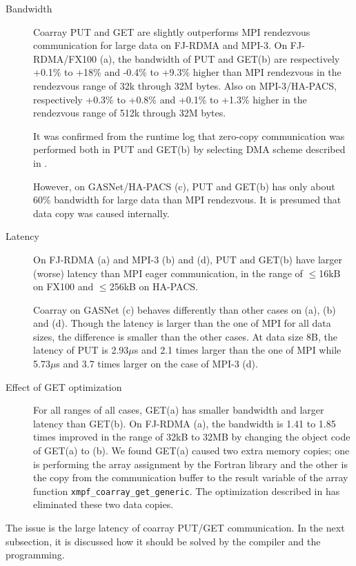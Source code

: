 \begin{description}

\item [Bandwidth]
Coarray PUT and GET are slightly outperforms MPI rendezvous communication for large data 
on FJ-RDMA and MPI-3.
On FJ-RDMA/FX100 (a), the bandwidth of PUT and GET(b) are respectively 
+0.1\% to +18\% and -0.4\% to +9.3\% higher than MPI rendezvous in the 
rendezvous range of 32k through 32M bytes.
Also on MPI-3/HA-PACS, respectively +0.3\% to +0.8\% and 
+0.1\% to +1.3\% higher in the rendezvous range of 512k through 32M bytes.

It was confirmed from the runtime log that zero-copy communication was performed
both in PUT and GET(b) by selecting DMA scheme described in .

However, on GASNet/HA-PACS (c), PUT and GET(b) has only about 60\% bandwidth for large data
than MPI rendezvous.
It is presumed that data copy was caused internally.

\item [Latency]
On FJ-RDMA (a) and MPI-3 (b) and (d), PUT and GET(b) have larger (worse) latency than 
MPI eager communication, in the range of $\leq$16kB on FX100 and $\leq$256kB on HA-PACS.

Coarray on GASNet (c) behaves differently than other cases on (a), (b) and (d).
Though the latency is larger than the one of MPI for all data sizes, the difference
is smaller than the other cases. At data size 8B, the latency of PUT is 2.93$\mu$s
and 2.1 times larger than the one of MPI 
while 5.73$\mu$s and 3.7 times larger on the case of MPI-3 (d).

\item [Effect of GET optimization]
For all ranges of all cases, GET(a) has smaller bandwidth and larger latency than GET(b).
On FJ-RDMA (a), the bandwidth is 1.41 to 1.85 times improved in the range of 32kB to 32MB
by changing the object code of GET(a) to (b).
We found GET(a) caused two extra memory copies; one is performing the array assignment 
by the Fortran library and the other is the copy from the communication buffer 
to the result variable of the array function {\tt xmpf\_coarray\_get\_generic}. 
The optimization described in  has eliminated these two data copies.

\end{description}

The issue is the large latency of coarray PUT/GET communication.
In the next subsection, it is discussed how it should be solved 
by the compiler and the programming.



